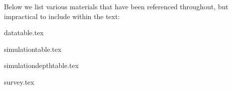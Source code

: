 \documentclass[class=article, crop=false]{standalone}
\begin{document}
	Below we list various materials that have been referenced throughout, but impractical to include within the text:

	{datatable.tex}

	{simulationtable.tex}

	{simulationdepthtable.tex}

	{survey.tex}
\end{document}
